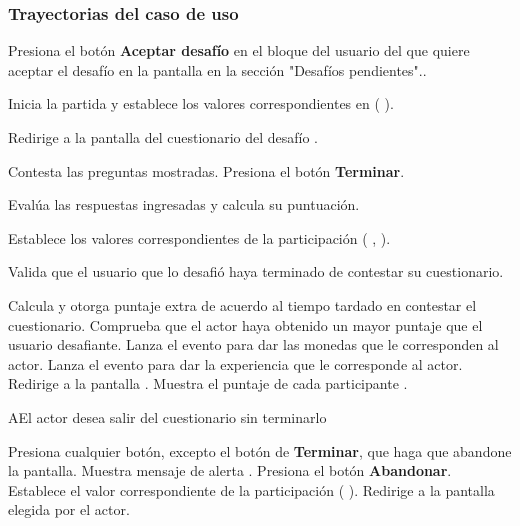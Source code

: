 \subsubsection{Trayectorias del caso de uso}

\begin{UCtrayectoria}%
%

    \Actor Presiona el botón {\bf Aceptar desafío} en el bloque del usuario del que quiere aceptar el desafío en la pantalla  en la sección "Desafíos pendientes"..

    \Sistema Inicia la partida y establece los valores correspondientes en  (  ).

    \Sistema Redirige a la pantalla del cuestionario del desafío .

    \Actor Contesta las preguntas mostradas. 
    \label{CU-C10-contesta-cuestionario}
    \Actor Presiona el botón {\bf Terminar}.

    \Sistema Evalúa las respuestas ingresadas y calcula su puntuación.

    \Sistema Establece los valores correspondientes de la participación  (
    ,
    ).

    \Sistema Valida que el usuario que lo desafió haya terminado de contestar su cuestionario. 

    \Sistema Calcula y otorga puntaje extra de acuerdo al tiempo tardado en contestar el cuestionario.
    \Sistema Comprueba que el actor haya obtenido un mayor puntaje que el usuario desafiante. 
    \Sistema Lanza el evento para dar las monedas que le corresponden al actor.
    \Sistema Lanza el evento para dar la experiencia que le corresponde al actor.
    \Sistema Redirige a la pantalla .
    \Sistema Muestra el puntaje de cada participante .

\end{UCtrayectoria}

\begin{UCtrayectoriaA}%
  {A}{El actor desea salir del cuestionario sin terminarlo}

  \Actor Presiona cualquier botón, excepto el botón de {\bf Terminar}, que haga que abandone la pantalla.
  \Sistema Muestra mensaje de alerta .
  \Actor Presiona el botón {\bf Abandonar}. 
  \Sistema Establece el valor correspondiente de la participación  (
  ).
  \Sistema Redirige a la pantalla elegida por el actor.

\end{UCtrayectoriaA}

